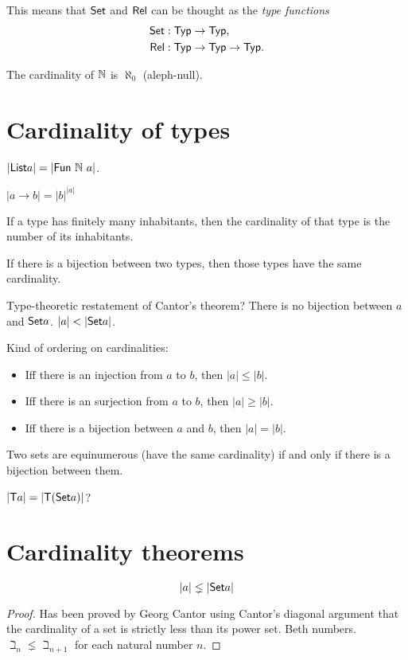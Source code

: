 \begin{itemize}
        This means that $\mathsf{Set}$ and $\mathsf{Rel}$ can be thought as the \emph{type functions}
        \begin{align*}
            \mathsf{Set} &: \mathsf{Typ} \to \mathsf{Typ},
            \\
            \mathsf{Rel} &: \mathsf{Typ} \to \mathsf{Typ} \to \mathsf{Typ}.
        \end{align*}
\end{itemize}

The cardinality of $\mathbb{N}$ is $\aleph_0$ (aleph-null).

\section{Cardinality of types}

$|\textsf{List}{a}| = |\mathsf{Fun}~\mathbb{N}~a|$.

\(|a \to b| = |b|^{|a|}\)

If a type has finitely many inhabitants,
then the cardinality of that type is the number of its inhabitants.

If there is a bijection between two types,
then those types have the same cardinality.

Type-theoretic restatement of Cantor's theorem?
There is no bijection between $a$ and $\textsf{Set}{a}$.
$|a| < |\textsf{Set}{a}|$.

Kind of ordering on cardinalities:
\begin{itemize}
    \item Iff there is an injection from $a$ to $b$, then $|a| \le |b|$.
    \item Iff there is an surjection from $a$ to $b$, then $|a| \ge |b|$.
    \item Iff there is a bijection between $a$ and $b$, then $|a| = |b|$.
\end{itemize}

Two sets are equinumerous (have the same cardinality) if and only if there is a bijection between them.

$|\mathsf{T} a| = |\mathsf{T} (\textsf{Set}{a})|$?

\section{Cardinality theorems}

\begin{mthm}
    \[
        |a| \lneq |\textsf{Set}{a}|
    \]
\begin{proof}
    Has been proved by Georg Cantor using Cantor's diagonal argument
    that the cardinality of a set is strictly less than its power set.
    Beth numbers.
    $\beth_n \lneq \beth_{n+1}$ for each natural number $n$.
\end{proof}
\end{mthm}

